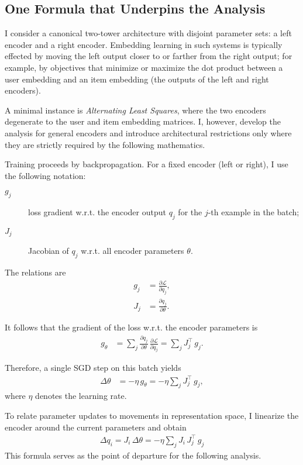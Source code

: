 \subsection{One Formula that Underpins the Analysis}

I consider a canonical two-tower architecture with disjoint parameter sets: a left encoder and a right encoder. Embedding learning in such systems is typically effected by moving the left output closer to or farther from the right output; for example, by objectives that minimize or maximize the dot product between a user embedding and an item embedding (the outputs of the left and right encoders).

A minimal instance is \emph{Alternating Least Squares}, where the two encoders degenerate to the user and item embedding matrices. I, however, develop the analysis for general encoders and introduce architectural restrictions only where they are strictly required by the following mathematics.

Training proceeds by backpropagation. For a fixed encoder (left or right), I use the following notation:

\begin{description}
\item[$g_j$] loss gradient w.r.t. the encoder output $q_j$ for the $j$-th example in the batch;
\item[$J_j$] Jacobian of $q_j$ w.r.t. all encoder parameters $\theta$.
\end{description}

The relations are
\begin{align}
g_j &= \frac{\partial \mathcal{L}}{\partial q_j},\\
J_j &= \frac{\partial q_j}{\partial \theta}.
\end{align}

It follows that the gradient of the loss w.r.t. the encoder parameters is
\begin{align}
g_{\theta} &= \sum_{j} \frac{\partial q_j}{\partial \theta}\, \frac{\partial \mathcal{L}}{\partial q_j}
= \sum_{j} J_{j}^{\!\top}\, g_{j}.
\end{align}

Therefore, a single SGD step on this batch yields
\begin{align}
\Delta \theta &= -\eta\,g_{\theta}
= -\eta \sum_{j} J_{j}^{\!\top}\, g_{j},
\end{align}
where $\eta$ denotes the learning rate.

To relate parameter updates to movements in representation space, I linearize the encoder around the current parameters and obtain
\begin{align}
\boxed{\; \Delta q_{i} = J_{i}\,\Delta\theta = -\eta \sum_{j} J_{i}\,J_{j}^{\!\top}\,g_{j} \;}
\end{align}
This formula serves as the point of departure for the following analysis.

